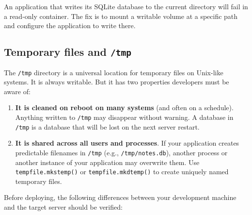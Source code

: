 \begin{codebox}[short]

\begin{Shaded}
\begin{Highlighting}[]
\end{Highlighting}
\end{Shaded}

\end{codebox}

\noindent{}An application that writes its SQLite database to the current directory will fail in a read-only container. The fix is to mount a writable volume at a specific path and configure the application to write there.

\subsection*{\texorpdfstring{Temporary files and \texttt{/tmp}}{Temporary files and /tmp}}\label{07-environment-drift:temporary-files-and-tmp}

The \texttt{/tmp} directory is a universal location for temporary files on Unix-like systems. It is always writable. But it has two properties developers must be aware of:

\begin{enumerate}
\def\labelenumi{\arabic{enumi}.}
\item
  \textbf{It is cleaned on reboot on many systems} (and often on a schedule). Anything written to \texttt{/tmp} may disappear without warning. A database in \texttt{/tmp} is a database that will be lost on the next server restart.
\item
  \textbf{It is shared across all users and processes}. If your application creates predictable filenames in \texttt{/tmp} (e.g., \texttt{/tmp/notes.db}), another process or another instance of your application may overwrite them. Use \texttt{tempfile.mkstemp()} or \texttt{tempfile.mkdtemp()} to create uniquely named temporary files.
\end{enumerate}

\label{07-environment-drift:environment-drift-summary-a-checklist}

Before deploying, the following differences between your development machine and the target server should be verified:


